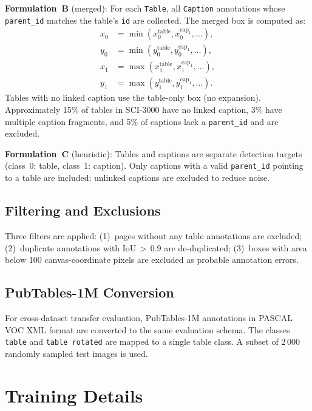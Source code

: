 \documentclass[pdflatex,sn-mathphys-num,iicol]{sn-jnl}
\begin{document}
\begin{appendices}
\textbf{Formulation~B} (merged): For each \texttt{Table}, all \texttt{Caption}
annotations whose \texttt{parent\_id} matches the table's \texttt{id} are collected.
The merged box is computed as:
\begin{align*}
x_0 &= \min(x_0^{\text{table}}, x_0^{\text{cap}_1}, \ldots), \\
y_0 &= \min(y_0^{\text{table}}, y_0^{\text{cap}_1}, \ldots), \\
x_1 &= \max(x_1^{\text{table}}, x_1^{\text{cap}_1}, \ldots), \\
y_1 &= \max(y_1^{\text{table}}, y_1^{\text{cap}_1}, \ldots).
\end{align*}
Tables with no linked caption use the table-only box (no expansion).
Approximately 15\% of tables in SCI-3000 have no linked caption, 3\% have multiple
caption fragments, and 5\% of captions lack a \texttt{parent\_id} and are excluded.

\textbf{Formulation~C} (heuristic): Tables and captions are separate detection targets
(class~0: table, class~1: caption). Only captions with a valid \texttt{parent\_id}
pointing to a table are included; unlinked captions are excluded to reduce noise.

\subsection*{Filtering and Exclusions}

Three filters are applied: (1)~pages without any table annotations are excluded;
(2)~duplicate annotations with IoU\,$>$\,0.9 are de-duplicated; (3)~boxes with area
below 100 canvas-coordinate pixels are excluded as probable annotation errors.

\subsection*{PubTables-1M Conversion}

For cross-dataset transfer evaluation, PubTables-1M annotations in PASCAL VOC XML
format are converted to the same evaluation schema. The classes \texttt{table} and
\texttt{table rotated} are mapped to a single table class. A subset of 2\,000 randomly
sampled test images is used.


\section{Training Details}\label{app:training}


\end{appendices}
\end{document}
